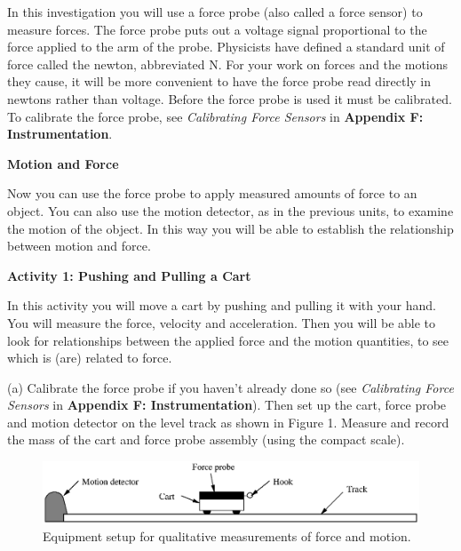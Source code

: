 In this investigation you will use a force probe (also called a force sensor) to measure forces. The force probe puts out a voltage signal proportional to the force applied to the arm of the probe. Physicists have defined a standard unit of force called the newton, abbreviated N. For your work on forces and the motions they cause, it will be more convenient to have the force probe read directly in newtons rather than voltage. Before the force probe is used it must be calibrated. To calibrate the force probe, see \textit{Calibrating Force Sensors} in \textbf{Appendix F: Instrumentation}.

\textbf{Motion and Force} 

Now you can use the force probe to apply measured amounts of force to an object.
You can also use the motion detector, as in the previous units, to examine the
motion of the object. In this way you will be able to establish the relationship
between motion and force.
\vspace{10mm}

\textbf{Activity 1: Pushing and Pulling a Cart} 

In this activity you will move a cart by pushing and pulling it with your hand.
You will measure the force, velocity and acceleration. Then you will be able
to look for relationships between the applied force and the motion quantities,
to see which is (are) related to force.

(a) Calibrate the force probe if you haven't already done so (see \textit{Calibrating Force Sensors} in \textbf{Appendix F: Instrumentation}). Then set up the cart, force probe and motion detector on the level track as shown in Figure 1. Measure and record the mass of the cart and force probe assembly (using the compact scale).

\vspace{10mm}

\begin{figure}
{\par\centering \includegraphics{force1_fig1.eps} \par}


\caption{Equipment setup for qualitative measurements of force and motion.}
\end{figure}


